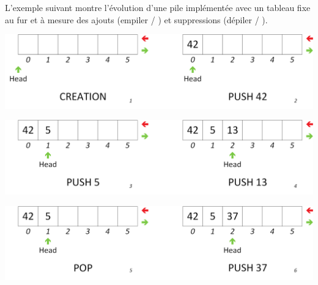 \documentclass[11pt,a4paper]{article}
\begin{document}
\smallskip

L'exemple suivant montre l'évolution d'une pile implémentée avec un tableau fixe au fur et à mesure des ajouts (empiler / ) et suppressions (dépiler / ).\\

\vfillFirst

\begin{center}
\includegraphics[scale=0.65]{img/piles/Piles_6_Tableau_Statique_Usage_pack_1.png}
\end{center}

\begin{center}
\includegraphics[scale=0.65]{img/piles/Piles_6_Tableau_Statique_Usage_pack_2.png}
\end{center}

\vfillLast

\pagebreak

\begin{center}
\includegraphics[scale=0.65]{img/piles/Piles_6_Tableau_Statique_Usage_pack_3.png}
\end{center}

\smallskip
\end{document}
